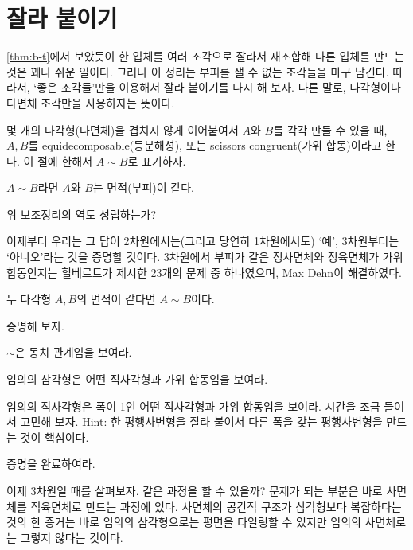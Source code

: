 \section{잘라 붙이기}
\cref{thm:b-t}에서 보았듯이 한 입체를 여러 조각으로 잘라서 재조합해 다른 입체를 만드는 것은 꽤나 쉬운 일이다. 그러나 이 정리는 부피를 잴 수 없는 조각들을 마구 남긴다. 따라서, `좋은 조각들'만을 이용해서 잘라 붙이기를 다시 해 보자. 다른 말로, 다각형이나 다면체 조각만을 사용하자는 뜻이다.
\begin{definition}
    몇 개의 다각형(다면체)을 겹치지 않게 이어붙여서 $A$와 $B$를 각각 만들 수 있을 때, $A, B$를 equidecomposable(등분해성), 또는 scissors congruent(가위 합동)이라고 한다. 이 절에 한해서 $A\sim B$로 표기하자. 
\end{definition}
\begin{lemma}
    $A\sim B$라면 $A$와 $B$는 면적(부피)이 같다. 
\end{lemma}
\begin{question}
    위 보조정리의 역도 성립하는가?
\end{question}
이제부터 우리는 그 답이 2차원에서는(그리고 당연히 1차원에서도) `예', 3차원부터는 `아니오'라는 것을 증명할 것이다. 
3차원에서 부피가 같은 정사면체와 정육면체가 가위 합동인지는 힐베르트가 제시한 23개의 문제 중 하나였으며, Max Dehn이 해결하였다. 
\begin{theorem}
    두 다각형 $A, B$의 면적이 같다면 $A\sim B$이다. 
\end{theorem}
증명해 보자. 
\begin{exercise}
    $\sim$은 동치 관계임을 보여라. 
\end{exercise}
\begin{exercise}
    임의의 삼각형은 어떤 직사각형과 가위 합동임을 보여라. 
\end{exercise}
\begin{exercise}
    임의의 직사각형은 폭이 1인 어떤 직사각형과 가위 합동임을 보여라. 시간을 조금 들여서 고민해 보자. Hint: 한 평행사변형을 잘라 붙여서 다른 폭을 갖는 평행사변형을 만드는 것이 핵심이다. 
\end{exercise}
\begin{exercise}
    증명을 완료하여라. 
\end{exercise}
이제 3차원일 때를 살펴보자. 같은 과정을 할 수 있을까? 문제가 되는 부분은 바로 사면체를 직육면체로 만드는 과정에 있다. 사면체의 공간적 구조가 삼각형보다 복잡하다는 것의 한 증거는 바로 임의의 삼각형으로는 평면을 타일링할 수 있지만 임의의 사면체로는 그렇지 않다는 것이다. \\
